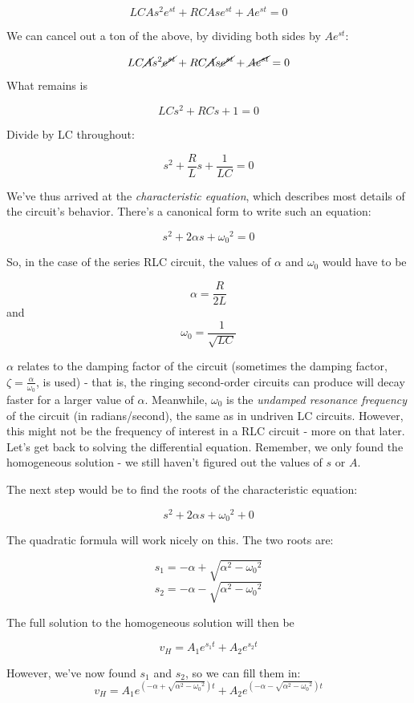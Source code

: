 \documentclass[12pt,a4paper]{report}
\begin{document}
\[ LC As^2 e^{st} + RC As e^{st} + A e^{st} = 0 \]

We can cancel out a ton of the above, by dividing both sides by $A e^{st}$:

\[ LC \cancel{A} s^2 \cancel{e^{st}} + RC \cancel{A}s \cancel{e^{st}} + \cancel{A e^{st}} = 0 \]
What remains is

\[ LC s^2 + RC s + 1 = 0 \]

Divide by LC throughout:

\[ s^2 + \frac{R}{L} s + \frac{1}{LC} = 0 \]

We've thus arrived at the \emph{characteristic equation}, which describes most details of the circuit's behavior. There's a canonical form to write such an equation:

\[ s^2 + 2\alpha s + {\omega_0}^2 = 0 \]

So, in the case of the series RLC circuit, the values of $\alpha$ and $\omega_0$ would have to be

\[ \alpha = \frac{R}{2L} \]
and
\[ \omega_0 = \frac{1}{\sqrt{LC}} \]

$\alpha$ relates to the damping factor of the circuit (sometimes the damping factor, $\displaystyle \zeta = \frac{\alpha}{\omega_0}$, is used) - that is, the ringing second-order circuits can produce will decay faster for a larger value of $\alpha$. Meanwhile, $\omega_0$ is the \emph{undamped resonance frequency} of the circuit (in radians/second), the same as in undriven LC circuits. However, this might not be the frequency of interest in a RLC circuit - more on that later.\\

Let's get back to solving the differential equation. Remember, we only found the homogeneous solution - we still haven't figured out the values of $s$ or $A$.

The next step would be to find the roots of the characteristic equation:

\[ s^2 + 2\alpha s + {\omega_0}^2 + 0 \]

The quadratic formula will work nicely on this. The two roots are:

\[ s_1 = -\alpha + \sqrt{\alpha^2 - {\omega_0}^2} \]
\[ s_2 = -\alpha - \sqrt{\alpha^2 - {\omega_0}^2} \]

The full solution to the homogeneous solution will then be

\[ v_H = A_1 e^{s_1 t} + A_2 e^{s_2 t} \]

However, we've now found $s_1$ and $s_2$, so we can fill them in:
\large
\[ v_H = A_1 e^{(-\alpha + \sqrt{\alpha^2 - {\omega_0}^2}) t} + A_2 e^{(-\alpha - \sqrt{\alpha^2 - {\omega_0}^2}) t} \]
\normalsize
\end{document}
